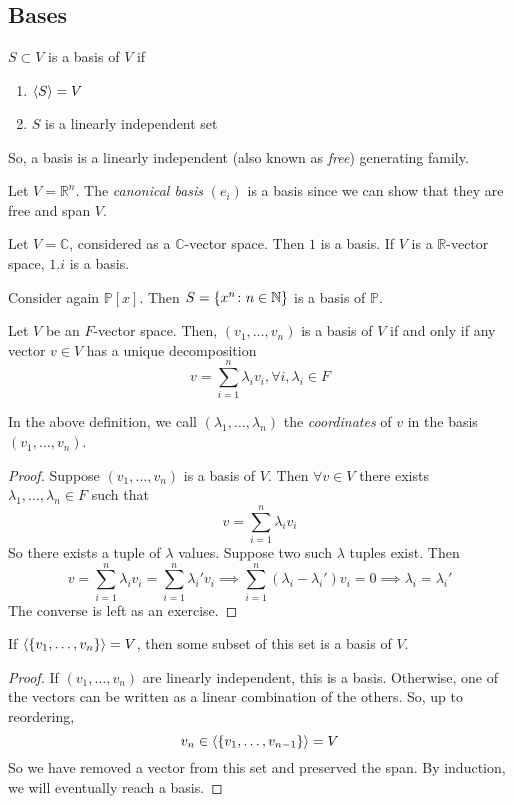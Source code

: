 \subsection{Bases}
\begin{definition}
	\( S \subset V \) is a basis of \( V \) if
	\begin{enumerate}
		\item \( \left\langle{} S \right\rangle = V \)
		\item \( S \) is a linearly independent set
	\end{enumerate}
	So, a basis is a linearly independent (also known as \textit{free}) generating family.
\end{definition}
\begin{example}
	Let \( V = \mathbb R^n \).
	The \textit{canonical basis} \( (e_i) \) is a basis since we can show that they are free and span \( V \).
\end{example}
\begin{example}
	Let \( V = \mathbb C \), considered as a \( \mathbb C \)-vector space.
	Then \( \qty{1} \) is a basis.
	If \( V \) is a \( \mathbb R \)-vector space, \( \qty{1,i} \) is a basis.
\end{example}
\begin{example}
	Consider again \( \mathbb P[x] \).
	Then \( S = \qty{x^n \colon n \in \mathbb N} \) is a basis of \( \mathbb P \).
\end{example}
\begin{lemma}
	Let \( V \) be an \( F \)-vector space.
	Then, \( (v_1, \dots, v_n) \) is a basis of \( V \) if and only if any vector \( v \in V \) has a unique decomposition
	\[
		v = \sum_{i=1}^n \lambda_i v_i, \forall i, \lambda_i \in F
	\]
\end{lemma}
\begin{remark}
	In the above definition, we call \( (\lambda_1, \dots, \lambda_n) \) the \textit{coordinates} of \( v \) in the basis \( (v_1, \dots, v_n) \).
\end{remark}
\begin{proof}
	Suppose \( (v_1, \dots, v_n) \) is a basis of \( V \).
	Then \( \forall v \in V \) there exists \( \lambda_1, \dots, \lambda_n \in F \) such that
	\[
		v = \sum_{i=1}^n \lambda_i v_i
	\]
	So there exists a tuple of \( \lambda \) values.
	Suppose two such \( \lambda \) tuples exist.
	Then
	\[
		v = \sum_{i=1}^n \lambda_i v_i = \sum_{i=1}^n \lambda_i' v_i \implies \sum_{i=1}^n (\lambda_i - \lambda_i') v_i = 0 \implies \lambda_i = \lambda_i'
	\]
	The converse is left as an exercise.
\end{proof}
\begin{lemma}
	If \( \left\langle{} \qty{v_1, \dots, v_n} \right\rangle = V \), then some subset of this set is a basis of \( V \).
\end{lemma}
\begin{proof}
	If \( (v_1, \dots, v_n) \) are linearly independent, this is a basis.
	Otherwise, one of the vectors can be written as a linear combination of the others.
	So, up to reordering,
	\[
		v_n \in \left\langle{} \qty{v_1, \dots, v_{n-1}} \right\rangle = V
	\]
	So we have removed a vector from this set and preserved the span.
	By induction, we will eventually reach a basis.
\end{proof}

